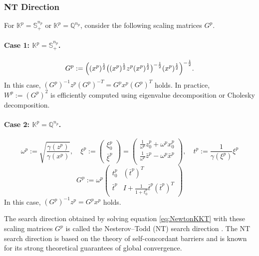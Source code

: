 \subsubsection{NT Direction}

For $\mathbb{K}^p = \mathbb{S}^{n_p}_+$ or $\mathbb{K}^p = \mathbb{Q}^{n_p}$, consider the following scaling matrices $G^p$.

\paragraph{Case 1: \(\mathbb{K}^p = \mathbb{S}^{n_p}_+\).}
\[
  G^p 
  := 
    \Bigl( (x^p)^{\frac12} \bigl( (x^p)^{\frac12} z^p (x^p)^{\frac12} \bigr)^{-\frac12} (x^p)^{\frac12} \Bigr)^{-\frac12}.
\]
In this case, $(G^p)^{-1} z^p (G^p)^{-T} = G^p x^p (G^p)^T$ holds. In practice, $W^p := (G^p)^2$ is efficiently computed using eigenvalue decomposition or Cholesky decomposition.

\paragraph{Case 2: \(\mathbb{K}^p = \mathbb{Q}^{n_p}\).}
\begin{equation}
    \omega^p := \sqrt{\frac{\gamma(z^p)}{\gamma(x^p)}}, 
    \quad 
    \xi^p 
    := \begin{pmatrix} \xi^p_0 \\ \bar{\xi}^p \end{pmatrix} 
    = \begin{pmatrix}
        \frac{1}{\omega^p} z^p_0 + \omega^p x^p_0 \\
        \frac{1}{\omega^p} \bar{z}^p - \omega^p \bar{x}^p \\
    \end{pmatrix},
    \quad
    t^p := \frac{1}{\gamma(\xi^p)}\xi^p
    \label{eq:scaling_mat_NT_socp_aux}
\end{equation}
\begin{equation}
    G^p := \omega^p \begin{pmatrix}
        t^p_0 & (\bar{t}^p)^T \\
        \bar{t}^p & I+\frac{1}{1 + t^p_0} \bar{t}^p(\bar{t}^p)^T
    \end{pmatrix}
    \label{eq:scaling_mat_NT_socp}
\end{equation}
In this case, $(G^p)^{-1} z^p = G^p x^p$ holds.

\medskip

The search direction obtained by solving equation \eqref{eq:NewtonKKT} with these scaling matrices $G^p$ is called the Nesterov--Todd (NT) search direction \cite{Nesterov1997,todd1998}. The NT search direction is based on the theory of self-concordant barriers and is known for its strong theoretical guarantees of global convergence.

